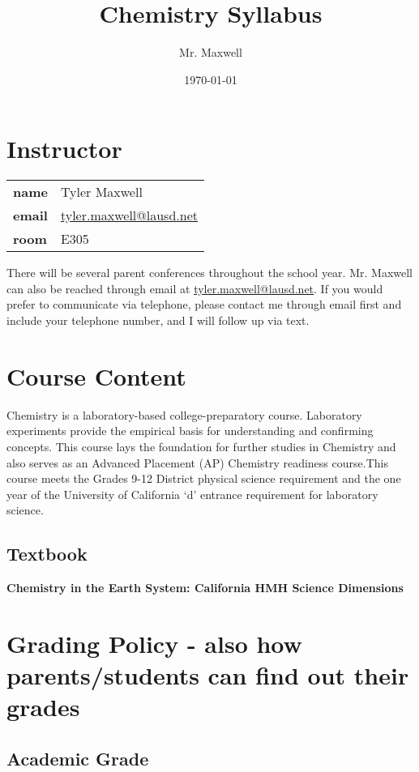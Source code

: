 \documentclass[11pt]{article}
\author{Mr. Maxwell}
\date{\today}
\title{Chemistry Syllabus}
\begin{document}
\section{Instructor}
\label{sec:orga21ce43}

\begin{center}
\begin{tabular}{ll}
\textbf{\textbf{name}} & Tyler Maxwell\\[0pt]
\textbf{\textbf{email}} & \href{mailto:tyler.maxwell@lausd.net}{tyler.maxwell@lausd.net}\\[0pt]
\textbf{\textbf{room}} & E305\\[0pt]
\end{tabular}
\end{center}

There will be several parent conferences throughout the school year. Mr. Maxwell can also be reached through email at \href{mailto:tyler.maxwell@lausd.net}{tyler.maxwell@lausd.net}. If you would prefer to communicate via telephone, please contact me through email first and include your telephone number, and I will follow up via text.

\section{Course Content}
\label{sec:org4121ed4}

Chemistry is a laboratory-based college-preparatory course. Laboratory experiments provide the empirical basis for understanding and confirming concepts. This course lays the foundation for further studies in Chemistry and also serves as an Advanced Placement (AP) Chemistry readiness course.This course meets the Grades 9-12 District physical science requirement and the one year of the University of California ‘d’ entrance requirement for laboratory science.

\subsection{Textbook}
\label{sec:orgc46e7fb}

\textbf{\textbf{Chemistry in the Earth System: California HMH Science Dimensions}}

\section{Grading Policy - also how parents/students can find out their grades}
\label{sec:org61dc726}
\subsection{Academic Grade}
\label{sec:orge04dc46}
\end{document}
